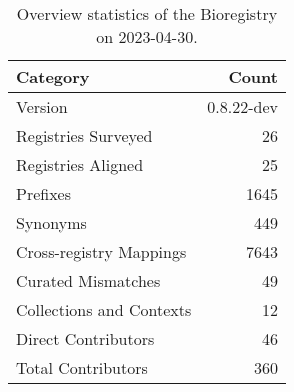 \begin{table}
\caption{Overview statistics of the Bioregistry on 2023-04-30.}
\label{tab:bioregistry-summary}
\begin{tabular}{lr}
\toprule
Category & Count \\
\midrule
Version & 0.8.22-dev \\
Registries Surveyed & 26 \\
Registries Aligned & 25 \\
Prefixes & 1645 \\
Synonyms & 449 \\
Cross-registry Mappings & 7643 \\
Curated Mismatches & 49 \\
Collections and Contexts & 12 \\
Direct Contributors & 46 \\
Total Contributors & 360 \\
\bottomrule
\end{tabular}
\end{table}
